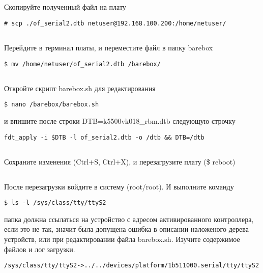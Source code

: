 \subsection{}Скопируйте полученный файл на плату
\begin{lstlisting}[style=bash]
# scp ./of_serial2.dtb netuser@192.168.100.200:/home/netuser/
\end{lstlisting}

\subsection{}Перейдите в терминал платы, и переместите файл в папку barebox
\begin{lstlisting}[style=bash]
$ mv /home/netuser/of_serial2.dtb /barebox/
\end{lstlisting}

\subsection{}Откройте скрипт barebox.sh для редактирования
\begin{lstlisting}[style=bash]
$ nano /barebox/barebox.sh
\end{lstlisting}
и впишите после строки DTB=k5500vk018\_rbm.dtb следующую строчку
\begin{lstlisting}[style=stdout]
fdt_apply -i $DTB -l of_serial2.dtb -o /dtb && DTB=/dtb
\end{lstlisting}

\subsection{}Сохраните изменения (Ctrl+S, Ctrl+X), и перезагрузите плату (\$ reboot)

\subsection{}После перезагрузки войдите в систему (root/root). И выполните команду
\begin{lstlisting}[style=bash]
$ ls -l /sys/class/tty/ttyS2
\end{lstlisting}
папка должна ссылаться на устройство с адресом активированного контроллера, если это не так, значит была допущена ошибка в описании наложеного дерева устройств, или при редактировании файла barebox.sh. Изучите содержимое файлов и лог загрузки.
\begin{lstlisting}[style=stdout]
/sys/class/tty/ttyS2->../../devices/platform/1b511000.serial/tty/ttyS2
\end{lstlisting}

